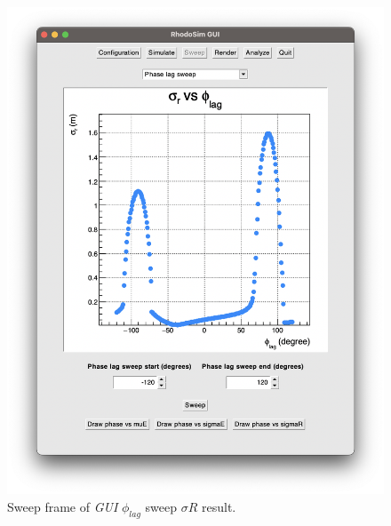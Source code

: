 \documentclass[a4paper,oneside,12pt]{report}
\numberwithin{equation}{chapter}
\begin{document}
\begin{figure}
    \centering
    \includegraphics[width=\linewidth]{./figures/rhodoSim/GUI_sweep_sR_3.png}
    \caption{Sweep frame of \textit{GUI}  $\phi_{lag}$ sweep $\sigma R$ result.}
    \label{fig:gui_sweep_sR}
\end{figure}
\end{document}
